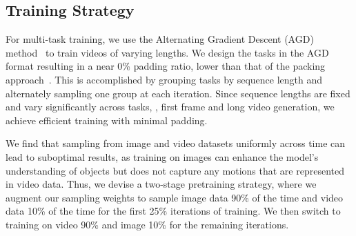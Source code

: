 \vspace{-2mm}
\subsection{Training Strategy} 
\label{sec:training}
\vspace{-2mm}

For multi-task training, we use the Alternating Gradient Descent (AGD) method~\cite{akbari2023alternating} to train videos of varying lengths. 
%
We design the tasks in the AGD format resulting in a near 0\% padding ratio, lower than that of the packing approach~\cite{raffel2020exploring}. 
%
This is accomplished by grouping tasks by sequence length and alternately sampling one group at each iteration.
%
Since sequence lengths are fixed and vary significantly across tasks, \eg, first frame and long video generation, we achieve efficient training with minimal padding.

We find that sampling from image and video datasets uniformly across time can lead to suboptimal results, as training on images can enhance the model's understanding of objects but does not capture any motions that are represented in video data.
%
Thus, we devise a two-stage pretraining strategy, where we augment our sampling weights to sample  image data 90\% of the time and video data 10\% of the time for the first 25\% iterations of training.
%
We then switch to training on video 90\% and image 10\% for the remaining iterations. 


